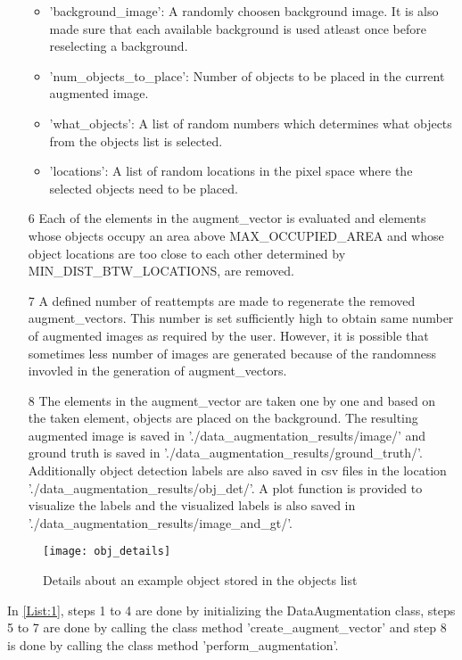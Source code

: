 \documentclass[paper=a4,11pt,parskip=half,toc=listof]{scrartcl}
\begin{document}
\begin{itemize}
			\begin{itemize}
				\item 'background\_image': A randomly choosen background image. It is also made sure that each available background is used atleast once before reselecting a background.
				\item 'num\_objects\_to\_place': Number of objects to be placed in the current augmented image.
				\item 'what\_objects': A list of random numbers which determines what objects from the objects list is selected.
				\item 'locations': A list of random locations in the pixel space where the selected objects need to be placed.
			\end{itemize}
		\item[6] Each of the elements in the augment\_vector is evaluated and elements whose objects occupy an area above MAX\_OCCUPIED\_AREA and whose object locations are too close to each other determined by MIN\_DIST\_BTW\_LOCATIONS, are removed.
		\item[7] A defined number of reattempts are made to regenerate the removed augment\_vectors. This number is set sufficiently high to obtain same number of augmented images as required by the user. However, it is possible that sometimes less number of images are generated because of the randomness invovled in the generation of augment\_vectors.
		\item[8] The elements in the augment\_vector are taken one by one and based on the taken element, objects are placed on the background. The resulting augmented image is saved in './data\_augmentation\_results/image/' and ground truth is saved in './data\_augmentation\_results/ground\_truth/'. Additionally object detection labels are also saved in csv files in the location './data\_augmentation\_results/obj\_det/'. A plot function is provided to visualize the labels and the visualized labels is also saved in './data\_augmentation\_results/image\_and\_gt/'.
	\end{itemize}
	
	\begin{figure}[htb!]
		\centering
		\texttt{[image: obj\_details]}
		\caption{Details about an example object stored in the objects list}
		\label{Fig:7}
	\end{figure}
	
In \ref{List:1}, steps 1 to 4 are done by initializing the DataAugmentation class, steps 5 to 7 are done by calling the class method 'create\_augment\_vector' and step 8 is done by calling the class method 'perform\_augmentation'.
	
\end{document}
